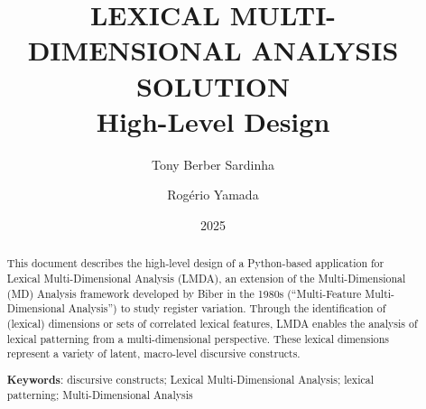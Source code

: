 \title{
    \LARGE \MakeUppercase{Lexical Multi-Dimensional Analysis Solution} \\
    \Large High-Level Design
}
\author{Tony Berber Sardinha \and Rogério Yamada} %
\date{2025}
\maketitle
\begin{abstract}
    This document describes the high-level design of a Python-based application for Lexical Multi-Dimensional Analysis (LMDA), an extension of the Multi-Dimensional (MD) Analysis framework developed by Biber in the 1980s (``Multi-Feature Multi-Dimensional Analysis'') to study register variation. Through the identification of (lexical) dimensions or sets of correlated lexical features, LMDA enables the analysis of lexical patterning from a multi-dimensional perspective. These lexical dimensions represent a variety of latent, macro-level discursive constructs. \parencite{berbersardinhaLexicalMultiDimensionalAnalysis2025}

    \vspace{1em}
    \textbf{Keywords}: discursive constructs; Lexical Multi-Dimensional Analysis; lexical patterning; Multi-Dimensional Analysis
\end{abstract}

\listoffigures
\tableofcontents

